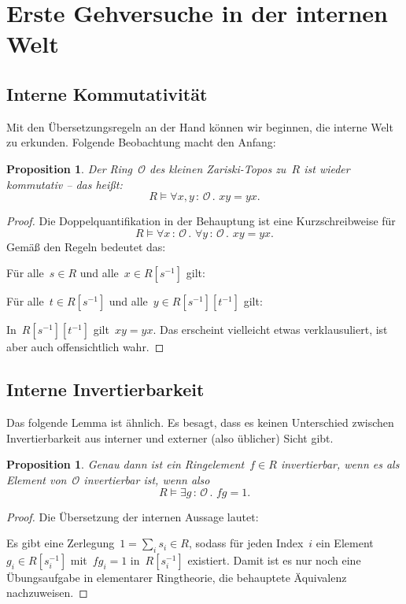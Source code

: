 \documentclass[a4paper,ngerman,12pt]{scrartcl}
\theoremstyle{definition}
\theoremstyle{plain}
\newtheorem{prop}[defn]{Proposition}
\theoremstyle{remark}
\renewcommand{\O}{\mathcal{O}}
\renewcommand{\_}{\mathpunct{.}\,}
\newcommand{\?}{\,{:}\,}
\newenvironment{indentblock}{%
  \list{}{\leftmargin\leftmargin}%
  \item\relax
}{%
  \endlist
}
\begin{document}
\section{Erste Gehversuche in der internen Welt}

\subsection{Interne Kommutativität}

Mit den Übersetzungsregeln an der Hand können wir beginnen, die interne Welt zu
erkunden. Folgende Beobachtung macht den Anfang:

\begin{prop}Der Ring~$\O$ des kleinen Zariski-Topos zu~$R$ ist wieder
kommutativ -- das heißt:
\[ R \models \forall x,y \? \O\_ x y = y x. \]
\end{prop}
\begin{proof}Die Doppelquantifikation in der Behauptung ist eine
Kurzschreibweise für
\[ R \models \forall x\?\O\_ \forall y\?\O\_ x y = y x. \]
Gemäß den Regeln bedeutet das:
\begin{indentblock}
Für alle~$s \in R$ und alle~$x \in R[s^{-1}]$ gilt:
\begin{indentblock}
Für alle~$t \in R[s^{-1}]$ und alle~$y \in R[s^{-1}][t^{-1}]$ gilt:
\begin{indentblock}
In~$R[s^{-1}][t^{-1}]$ gilt~$xy = yx$.
\end{indentblock}
\end{indentblock}
\end{indentblock}
Das erscheint vielleicht etwas verklausuliert, ist aber auch offensichtlich
wahr.
\end{proof}


\subsection{Interne Invertierbarkeit}

Das folgende Lemma ist ähnlich. Es besagt, dass es keinen Unterschied zwischen
Invertierbarkeit aus interner und externer (also üblicher) Sicht gibt.
\begin{prop}\label{interne-invertierbarkeit}%
Genau dann ist ein Ringelement~$f \in R$ invertierbar, wenn es als Element
von~$\O$ invertierbar ist, wenn also
\[ R \models \exists g\?\O\_ fg = 1. \]
\end{prop}
\begin{proof}
Die Übersetzung der internen Aussage lautet:
\begin{indentblock}
Es gibt eine Zerlegung~$1 = \sum_i s_i \in R$, sodass für jeden Index~$i$ ein
Element $g_i \in R[s_i^{-1}]$ mit~$fg_i = 1$ in~$R[s_i^{-1}]$ existiert.
\end{indentblock}
Damit ist es nur noch eine Übungsaufgabe in elementarer Ringtheorie, die
behauptete Äquivalenz nachzuweisen.
\end{proof}
\end{document}
